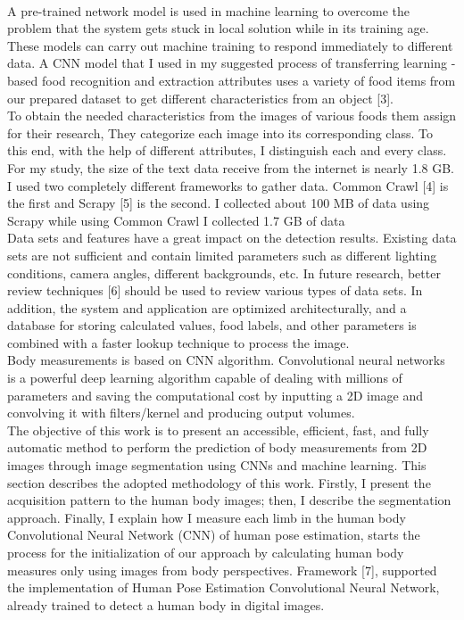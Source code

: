 \documentclass[a4paper,12pt,toc=flat]{report}
\begin{document}
{		\\
		A pre-trained network model is used in machine learning to overcome the problem that the system gets stuck in local solution while in its training age. These models can carry out machine training to respond immediately to different data. A CNN model that I used in my suggested process of transferring learning -based food recognition and extraction attributes uses a variety of food items from our prepared dataset to get different characteristics from an object [3].
		\\
		To obtain the needed characteristics from the images of various foods them assign for their research, They categorize each image into its corresponding class. To this end, with the help of different attributes, I distinguish each and every class. For my study, the size of the text data  receive from the internet is nearly 1.8 GB. I used two completely different frameworks to gather data. Common Crawl [4]  is the first and Scrapy [5] is the second. I collected about 100 MB of data using Scrapy while using Common Crawl I collected 1.7 GB of data
		\\
		Data sets and features have a great impact on the detection results. Existing data sets are not sufficient and contain limited parameters such as different lighting conditions, camera angles, different backgrounds, etc. In future research, better review techniques [6] should be used to review various types of data sets. In addition, the system and application are optimized architecturally, and a database for storing calculated values, food labels, and other parameters is combined with a faster lookup technique to process the image. \\
		 Body measurements is based on CNN algorithm.
		 Convolutional neural networks is a powerful deep learning algorithm capable of dealing with millions of parameters and saving the computational cost by inputting a 2D image and convolving it with filters/kernel and producing output volumes. \\
		The objective of this work is to present an accessible,
		efficient, fast, and fully automatic method to perform the
		prediction of body measurements from 2D images through
		image segmentation using CNNs and machine learning. This section describes the adopted methodology of this
		work. Firstly, I present the acquisition pattern to the human
		body images; then, I describe the segmentation approach.
		Finally, I explain how I measure each limb in the human
		body
		\\ Convolutional Neural Network (CNN) of human pose estimation, starts the process for the initialization of our approach
		by calculating human body measures only using images from
		body perspectives.
		Framework [7], supported the implementation of Human Pose Estimation Convolutional Neural Network, already
		trained to detect a human body in digital images.
	
}
\end{document}
